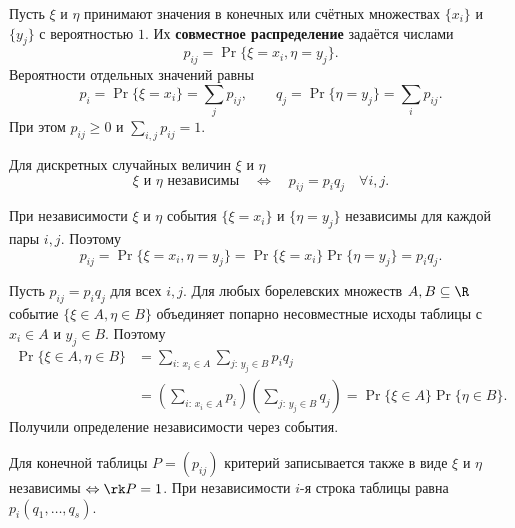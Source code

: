 

\begin{definition}
    Пусть $\xi$ и $\eta$ принимают значения в конечных или счётных
    множествах $\{x_i\}$ и $\{y_j\}$ с вероятностью $1$.
    Их \textbf{совместное распределение} задаётся числами
    \[
        p_{ij}=\Pr\{\xi=x_i,\eta=y_j\}.
    \]
    Вероятности отдельных значений равны
    \[
        p_i=\Pr\{\xi=x_i\}=\sum_jp_{ij},\qquad
        q_j=\Pr\{\eta=y_j\}=\sum_ip_{ij}.
    \]
    При этом $p_{ij}\geq0$ и $\sum_{i,j}p_{ij}=1$.
\end{definition}

\begin{theorem}
    Для дискретных случайных величин $\xi$ и $\eta$
    \[
        \xi\text{ и }\eta\text{ независимы}
        \quad\Leftrightarrow\quad
        p_{ij}=p_iq_j\quad\forall i,j.
    \]
\end{theorem}

\begin{Proof}[$\Rightarrow$]
При независимости $\xi$ и $\eta$ события $\{\xi=x_i\}$ и $\{\eta=y_j\}$
независимы для каждой пары $i,j$. Поэтому
\[
 p_{ij}=\Pr\{\xi=x_i,\eta=y_j\}
       =\Pr\{\xi=x_i\}\Pr\{\eta=y_j\}=p_iq_j.
\]
\end{Proof}
\begin{Proof}[$\Leftarrow$\editorialmark]
Пусть $p_{ij}=p_iq_j$ для всех $i,j$. Для любых борелевских множеств
$A,B\subseteq\R$ событие $\{\xi\in A,\eta\in B\}$ объединяет попарно
несовместные исходы таблицы с $x_i\in A$ и $y_j\in B$. Поэтому
\[
 \begin{aligned}
 \Pr\{\xi\in A,\eta\in B\}
 &=\sum_{i:\,x_i\in A}\sum_{j:\,y_j\in B} p_iq_j\\
 &=\left(\sum_{i:\,x_i\in A}p_i\right)
   \left(\sum_{j:\,y_j\in B}q_j\right)
 =\Pr\{\xi\in A\}\Pr\{\eta\in B\}.
 \end{aligned}
\]
Получили определение независимости через события.
\end{Proof}

\begin{remark}
Для конечной таблицы $P=(p_{ij})$ критерий записывается также в виде
$\xi$ и $\eta$ независимы $\Leftrightarrow \rk P=1$.
При независимости $i$-я строка таблицы равна $p_i(q_1,\ldots,q_s)$.
\end{remark}

